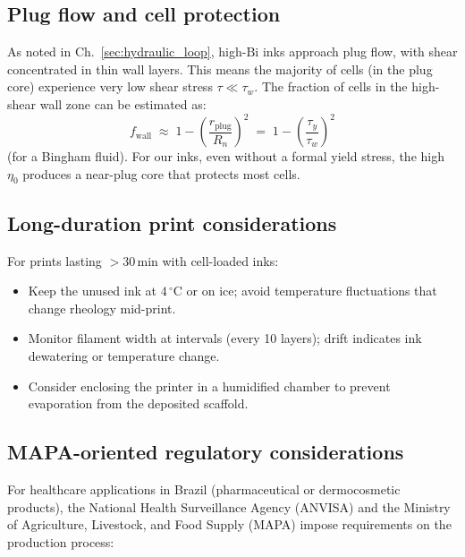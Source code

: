 \documentclass[11pt,a4paper]{article}
\newcommand{\Bi}{\mathrm{Bi}}
\begin{document}
\subsection{Plug flow and cell protection}

As noted in Ch.~\ref{sec:hydraulic_loop}, high-$\Bi$ inks approach
plug flow, with shear concentrated in thin wall layers. This means the
majority of cells (in the plug core) experience very low shear stress
$\tau\ll\tau_w$. The fraction of cells in the high-shear wall zone can
be estimated as:
\[
f_\mathrm{wall} \;\approx\; 1 - \left(\frac{r_\mathrm{plug}}{R_n}\right)^2
\;=\; 1 - \left(\frac{\tau_y}{\tau_w}\right)^2
\]
(for a Bingham fluid). For our inks, even without a formal yield stress,
the high $\eta_0$ produces a near-plug core that protects most cells.

\subsection{Long-duration print considerations}

For prints lasting $>30\,\si{\minute}$ with cell-loaded inks:
\begin{itemize}[leftmargin=1.6em,itemsep=2pt]
\item Keep the unused ink at $4\,^\circ$C or on ice; avoid temperature
  fluctuations that change rheology mid-print.
\item Monitor filament width at intervals (every 10 layers); drift
  indicates ink dewatering or temperature change.
\item Consider enclosing the printer in a humidified chamber to prevent
  evaporation from the deposited scaffold.
\end{itemize}

\subsection{MAPA-oriented regulatory considerations}

For healthcare applications in Brazil (pharmaceutical or dermocosmetic
products), the National Health Surveillance Agency (ANVISA) and the
Ministry of Agriculture, Livestock, and Food Supply (MAPA) impose
requirements on the production process:
\end{document}
